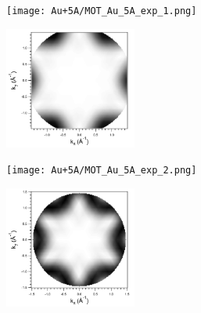         \begin{figure}
            \centering
            \begin{subfigure}[t]{0.48\textwidth}
                \centering
                \texttt{[image: Au+5A/MOT\_Au\_5A\_exp\_1.png]}
                \label{fig:MOT_Au+5A_exp_1}
            \end{subfigure}
            \begin{subfigure}[t]{0.48\textwidth}
                \centering
                \includegraphics[height=4cm]{Au+5A/HOMO_all_CT}
                \label{fig:MOT_Au+5A_theo_1}
            \end{subfigure}
            \centering
            \begin{subfigure}[t]{0.48\textwidth}
                \centering
                \texttt{[image: Au+5A/MOT\_Au\_5A\_exp\_2.png]}
                \label{fig:MOT_Au+5A_exp_2}
            \end{subfigure}
            \begin{subfigure}[t]{0.48\textwidth}
                \centering
                \includegraphics[height=4cm]{Au+5A/HOMO1_all_CT}
                \label{fig:MOT_Au+5A_theo_2}
            \end{subfigure}
            \begin{subfigure}[t]{0.48\textwidth}
                \centering

\end{subfigure}
\end{figure}

